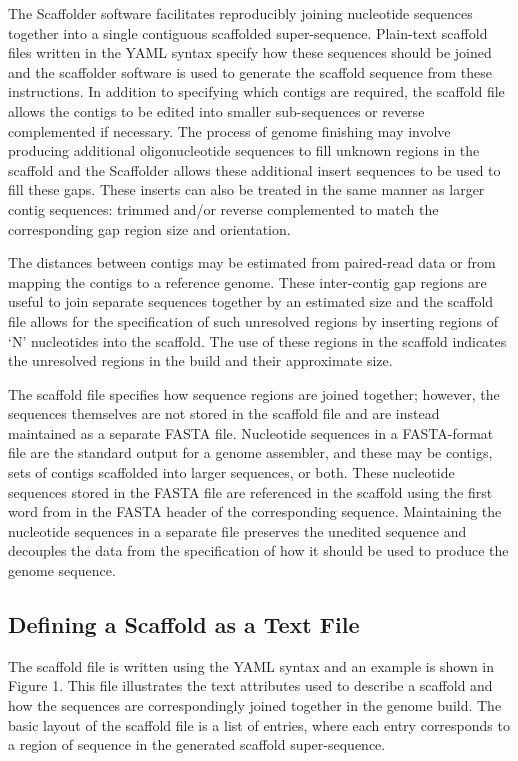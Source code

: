 \documentclass[10pt]{bmc_article}
\newenvironment{bmcformat}{\begin{raggedright}\baselineskip20pt\sloppy\setboolean{publ}{false}}{\end{raggedright}\baselineskip20pt\sloppy}
\begin{document}
\begin{bmcformat}
The Scaffolder software facilitates reproducibly joining nucleotide sequences
together into a single contiguous scaffolded super-sequence. Plain-text
scaffold files written in the YAML syntax specify how these sequences should
be joined and the scaffolder software is used to generate the scaffold
sequence from these instructions. In addition to specifying which contigs are
required, the scaffold file allows the contigs to be edited into smaller
sub-sequences or reverse complemented if necessary. The process of genome
finishing may involve producing additional oligonucleotide sequences to fill
unknown regions in the scaffold and the Scaffolder allows these additional
insert sequences to be used to fill these gaps. These inserts can also be
treated in the same manner as larger contig sequences: trimmed and/or reverse
complemented to match the corresponding gap region size and orientation. \pb

The distances between contigs may be estimated from paired-read data or from
mapping the contigs to a reference genome. These inter-contig gap regions are
useful to join separate sequences together by an estimated size and the
scaffold file allows for the specification of such unresolved regions by
inserting regions of `N' nucleotides into the scaffold. The use of these
regions in the scaffold indicates the unresolved regions in the build and their
approximate size. \pb

The scaffold file specifies how sequence regions are joined together; however,
the sequences themselves are not stored in the scaffold file and are instead
maintained as a separate FASTA file. Nucleotide sequences in a FASTA-format
file are the standard output for a genome assembler, and these may be contigs,
sets of contigs scaffolded into larger sequences, or both. These nucleotide
sequences stored in the FASTA file are referenced in the scaffold using the
first word from in the FASTA header of the corresponding sequence. Maintaining
the nucleotide sequences in a separate file preserves the unedited sequence
and decouples the data from the specification of how it should be used to
produce the genome sequence. \pb

\subsection*{Defining a Scaffold as a Text File} %

The scaffold file is written using the YAML syntax and an example is shown in
Figure 1. This file illustrates the text attributes used to describe
a scaffold and how the sequences are correspondingly joined together in the
genome build. The basic layout of the scaffold file is a list of entries,
where each entry corresponds to a region of sequence in the generated scaffold
super-sequence. \pb


\end{bmcformat}
\end{document}
